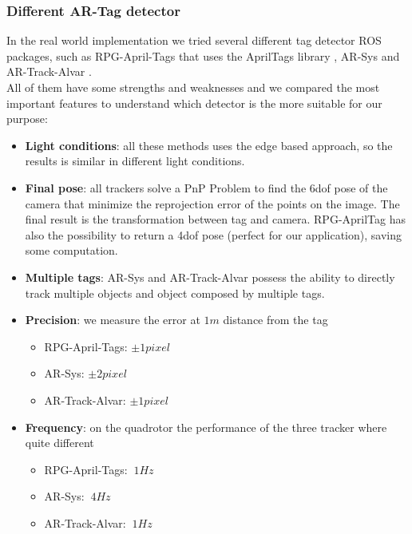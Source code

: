 \subsubsection{Different AR-Tag detector}
In the real world implementation we tried several different tag detector ROS packages, such as  RPG-April-Tags \cite{rpgapriltags} that uses the  AprilTags library \cite{apriltagslibrary}, AR-Sys \cite{arsys} and AR-Track-Alvar \cite{artrackalvar}.\\
All of them have some strengths and weaknesses and we compared the most important features to understand which detector is the more suitable for our purpose:
\begin{itemize}
\item \textbf{Light conditions}: all these methods uses the edge based approach, so the results is similar in different light conditions.
\item \textbf{Final pose}: all trackers solve a PnP Problem to find the 6dof pose of the camera that minimize the reprojection error of the points on the image. The final result is the transformation between tag and camera. RPG-AprilTag has also the possibility to return a 4dof pose (perfect for our application), saving some computation.
\item \textbf{Multiple tags}: AR-Sys and AR-Track-Alvar possess the ability to directly track multiple objects and object composed by multiple tags.
\item \textbf{Precision}: we measure the error at $1m$ distance from the tag
\begin{itemize}
\item RPG-April-Tags: $\pm 1 pixel $ 
\item AR-Sys: $\pm 2 pixel $
\item AR-Track-Alvar: $\pm 1 pixel $
\end{itemize}
\item \textbf{Frequency}: on the quadrotor the performance of the three tracker where quite different
\begin{itemize}
\item RPG-April-Tags: $~1Hz$
\item AR-Sys: $~4Hz$
\item AR-Track-Alvar: $~1Hz$
\end{itemize}
\end{itemize}

